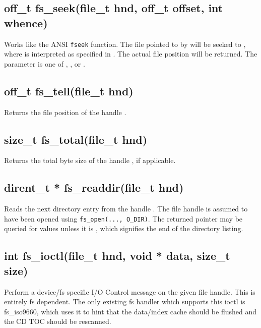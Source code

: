 \documentclass[english]{report}
\begin{document}
\subsection{off\_t fs\_seek(file\_t hnd, off\_t offset, int whence)}

Works like the ANSI \texttt{fseek} function. The file pointed to by
 will be seeked to , where  is
interpreted as specified in . The actual file position
will be returned. The  parameter is one of ,
, or .


\subsection{off\_t fs\_tell(file\_t hnd)}

Returns the file position of the handle .


\subsection{size\_t fs\_total(file\_t hnd)}

Returns the total byte size of the handle , if applicable.


\subsection{dirent\_t * fs\_readdir(file\_t hnd)}

Reads the next directory entry from the handle . The file
handle is assumed to have been opened using \texttt{fs\_open(...,
O\_DIR)}. The returned pointer may be queried for values unless it
is , which signifies the end of the directory listing.


\subsection{int fs\_ioctl(file\_t hnd, void * data, size\_t size)}

Perform a device/fs specific I/O Control message on the given file
handle. This is entirely fs dependent. The only existing fs handler
which supports this ioctl is fs\_iso9660, which uses it to hint that
the data/index cache should be flushed and the CD TOC should be rescanned.
\end{document}
